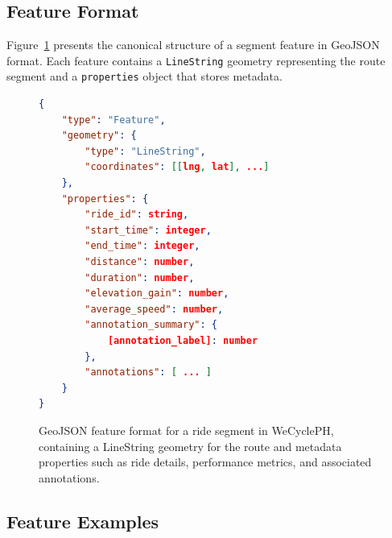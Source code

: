 \subsection{Feature Format}
Figure~\ref{fig:Feature_Format} presents the canonical structure of a segment feature in GeoJSON format. Each feature contains a \texttt{LineString} geometry representing the route segment and a \texttt{properties} object that stores metadata.
\begin{figure}[H]
\centering
\begin{lstlisting}[language=json, label={lst:feature_format}]
{
    "type": "Feature",
    "geometry": {
        "type": "LineString",
        "coordinates": [[lng, lat], ...]
    },
    "properties": {
        "ride_id": string,
        "start_time": integer,
        "end_time": integer,
        "distance": number,
        "duration": number,
        "elevation_gain": number,
        "average_speed": number,
        "annotation_summary": {
            [annotation_label]: number
        },
        "annotations": [ ... ]
    }
}
\end{lstlisting}
\caption{GeoJSON feature format for a ride segment in WeCyclePH, containing a LineString geometry for the route and metadata properties such as ride details, performance metrics, and associated annotations.}
\label{fig:Feature_Format}
\end{figure}

\subsection{Feature Examples}

